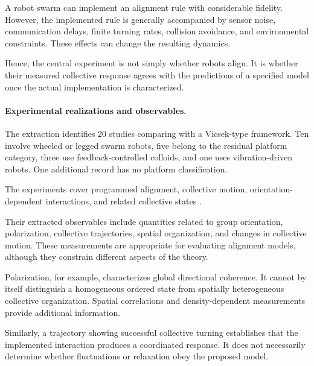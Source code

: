 A robot swarm can implement an alignment rule
with considerable fidelity. However, the
implemented rule is generally accompanied by
sensor noise, communication delays, finite
turning rates, collision avoidance, and
environmental constraints. These effects
can change the resulting dynamics.

Hence, the central experiment is not simply
whether robots align. It is whether their
measured collective response agrees with
the predictions of a specified model once
the actual implementation is characterized.

\paragraph*{Experimental realizations and observables.}

The extraction identifies 20 studies comparing
with a Vicsek-type framework. Ten involve
wheeled or legged swarm robots, five belong
to the residual platform category, three
use feedback-controlled colloids, and one
uses vibration-driven robots. One additional
record has no platform classification.

The experiments cover programmed alignment,
collective motion, orientation-dependent
interactions, and related collective states
\cite{Turgut2008selforganizedflocka,Tarcai2011patternstransition,Vsrhelyi2014outdoorflockingand,Balzs2020adaptiveleadership,Fernando2021onlineflockingcont,Wang2022optiswarmopticals,Xiao2023perceptionofmotion,Zheng2024bodyorientationcha,Jianchao2024emergentchiralitya,Verdoucq2025flockingphasetrans,Zheng2026nestedinteractionn,Dizenhaus2026anonymousleadership,Zhang2026noiseresilientimpl,Yasuda2014selforganizedflockb}.

Their extracted observables include quantities
related to group orientation, polarization,
collective trajectories, spatial organization,
and changes in collective motion. These
measurements are appropriate for evaluating
alignment models, although they constrain
different aspects of the theory.

Polarization, for example, characterizes
global directional coherence. It cannot
by itself distinguish a homogeneous
ordered state from spatially heterogeneous
collective organization. Spatial correlations
and density-dependent measurements provide
additional information.

Similarly, a trajectory showing successful
collective turning establishes that
the implemented interaction produces
a coordinated response. It does not
necessarily determine whether fluctuations
or relaxation obey the proposed model.

